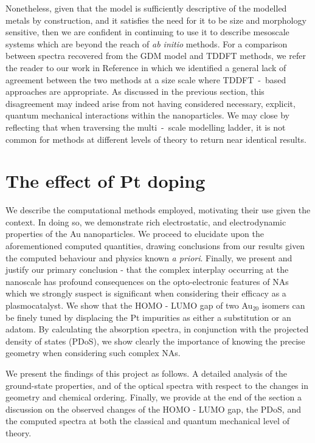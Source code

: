 Nonetheless, given that the model is sufficiently descriptive of the modelled metals by construction, and it satisfies the need for it to be size and morphology sensitive, then we are confident in continuing to use it to describe mesoscale systems which are beyond the reach of \textit{ab initio} methods. For a comparison between spectra recovered from the GDM model and TDDFT methods, we refer the reader to our work in Reference \cite{Wei} in which we identified a general lack of agreement between the two methods at a size scale where TDDFT~-~based approaches are appropriate. As discussed in the previous section, this disagreement may indeed arise from not having considered necessary, explicit, quantum mechanical interactions within the nanoparticles. We may close by reflecting that when traversing the multi~-~scale modelling ladder, it is not common for methods at different levels of theory to return near identical results.

\clearpage
\section{The effect of Pt doping}
\label{sec:AuPt_DFT}

We describe the computational methods employed, motivating their use given the context. In doing so, we demonstrate rich electrostatic, and electrodynamic properties of the Au nanoparticles. We proceed to elucidate upon the aforementioned computed quantities, drawing conclusions from our results given the computed behaviour and physics known \textit{a priori}. Finally, we present and justify our primary conclusion - that the complex interplay occurring at the nanoscale has profound consequences on the opto-electronic features of NAs which we strongly suspect is significant when considering their efficacy as a plasmocatalyst. We show that the HOMO - LUMO gap of two Au$_{20}$ isomers can be finely tuned by displacing the Pt impurities as either a substitution or an adatom. By calculating the absorption spectra, in conjunction with the projected density of states (PDoS), we show clearly the importance of knowing the precise geometry when considering such complex NAs.

We present the findings of this project as follows. A detailed analysis of the ground-state properties, and of the optical spectra with respect to the changes in geometry and chemical ordering. Finally, we provide at the end of the section a discussion on the observed changes of the HOMO - LUMO gap, the PDoS, and the computed spectra at both the classical and quantum mechanical level of theory.

